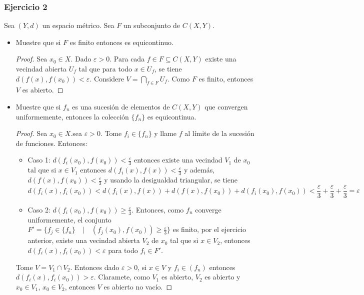 \documentclass[letterpaper]{article}
\begin{document}
\subsubsection*{Ejercicio 2}
Sea $(Y,d)$ un espacio m\'etrico. Sea $F$  un subconjunto de $\textit{C}(X,Y)$.
\begin{itemize}
\item Muestre que si $F$ es finito entonces es equicontinuo.
\begin{proof}
Sea $x_0\in X$. Dado $\varepsilon > 0$. Para cada $f\in F \subseteq C(X,Y)$ existe una vecindad abierta $U_{f}$ tal  que para todo $x\in U_{f}$, se  tiene $d(f(x), f(x_0))< \varepsilon$. Considere $V= \bigcap_{f\in F}{U_{f}}$. Como $F$ es finito, entonces $V$ es abierto. 
\end{proof}
\item Muestre que si $f_n$ es una sucesi\'on de elementos de $\textit{C}(X,Y)$  que convergen uniformemente, entonces la colecci\'on $\{f_n\}$ es equicontinua.
\begin{proof}
Sea $x_0\in X$.sea $\varepsilon>0$. Tome $f_i \in \{f_n\}$ y  llame $f$   al l\'imite de la sucesi\'on de funciones.  Entonces:\\
\begin{itemize}
\item Caso 1: $d(f_i(x_0),f(x_0))<\frac{\varepsilon}{3}$ entonces existe una vecindad $V_1$  de $x_0$  tal  que si $x\in V_1$ entonces $d(f_i(x),f(x))<\frac{\varepsilon}{3}$ y adem\'as, $d(f(x),f(x_0))<\frac{\varepsilon}{3}$ y usando la desigualdad triangular, se tiene 
\begin{equation*}
d(f_i(x),f_i(x_0))<d(f_i(x),f(x))+d(f(x),f(x_0))+d(f_i(x_0),f(x_0))<\frac{\varepsilon}{3}+\frac{\varepsilon}{3}+\frac{\varepsilon}{3}=\varepsilon
\end{equation*}
\item  Caso 2: $d(f_i(x_0),f(x_0))\geq \frac{\varepsilon}{3}$. Entonces, como  $f_n$ converge uniformemente, el conjunto $F'=\{ f_j\in \{ f_n\} \quad | \quad (f_j(x_0),f(x_0))\geq \frac{\varepsilon}{3} \}$ es  finito, por el ejercicio anterior, existe una vecindad abierta $V_2$ de $x_0$ tal que si $x\in V_2$, entonces $d(f_i(x), f_i(x_0))<\varepsilon$ para todo $f_i \in F'$.\\
\end{itemize}
Tome $V=V_1 \cap V_2$. Entonces dado $\varepsilon > 0$, si $x \in V$ y $f_i \in (f_n)$ entonces $d(f_i(x), f_i(x_0)) > \varepsilon$. Claramete, como $V_1$ es abierto, $V_2$ es abierto y $x_0 \in V_1$, $x_0 \in V_2$, entonces $V$ es abierto no vac\'io.
\end{proof}

\end{itemize}
\end{document}
